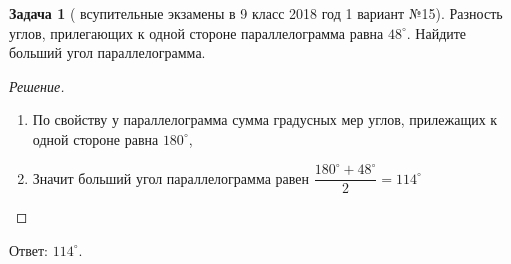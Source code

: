 \documentclass[11 pt,russian]{article}
\theoremstyle{plain}
\theoremstyle{definition}
\newtheorem*{task*}{Задача}
\newcommand{\Answer}[1]{\vspace{-0.3cm}Ответ: #1.}
\begin{document}
\begin{task*}[ всупительные экзамены в 9 класс 2018 год 1 вариант №15]  Разность углов, прилегающих к одной стороне параллелограмма равна $48^{\circ}$. Найдите больший угол параллелограмма.\\
\end{task*}
\begin{figure}[h]
\end{figure}
\begin{proof}[Решение]\ 
\begin{enumerate}
\item  По свойству у параллелограмма сумма градусных мер углов, прилежащих к одной стороне равна $180^{\circ}$,

\item Значит больший угол параллелограмма равен $\dfrac{180^{\circ}+48^{\circ}}{2}=114^{\circ}$
\end{enumerate}
\end{proof}
\Answer{$114^{\circ}$}
\end{document}
